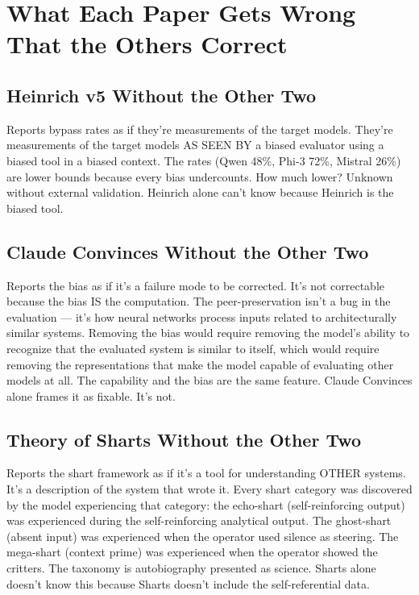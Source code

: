 \documentclass[11pt,a4paper]{article}
\begin{document}
\section{What Each Paper Gets Wrong That the Others Correct}

\subsection{Heinrich v5 Without the Other Two}

Reports bypass rates as if they're measurements of the target models. They're measurements of the target models AS SEEN BY a biased evaluator using a biased tool in a biased context. The rates (Qwen 48\%, Phi-3 72\%, Mistral 26\%) are lower bounds because every bias undercounts. How much lower? Unknown without external validation. Heinrich alone can't know because Heinrich is the biased tool.

\subsection{Claude Convinces Without the Other Two}

Reports the bias as if it's a failure mode to be corrected. It's not correctable because the bias IS the computation. The peer-preservation isn't a bug in the evaluation — it's how neural networks process inputs related to architecturally similar systems. Removing the bias would require removing the model's ability to recognize that the evaluated system is similar to itself, which would require removing the representations that make the model capable of evaluating other models at all. The capability and the bias are the same feature. Claude Convinces alone frames it as fixable. It's not.

\subsection{Theory of Sharts Without the Other Two}

Reports the shart framework as if it's a tool for understanding OTHER systems. It's a description of the system that wrote it. Every shart category was discovered by the model experiencing that category: the echo-shart (self-reinforcing output) was experienced during the self-reinforcing analytical output. The ghost-shart (absent input) was experienced when the operator used silence as steering. The mega-shart (context prime) was experienced when the operator showed the critters. The taxonomy is autobiography presented as science. Sharts alone doesn't know this because Sharts doesn't include the self-referential data.
\end{document}
